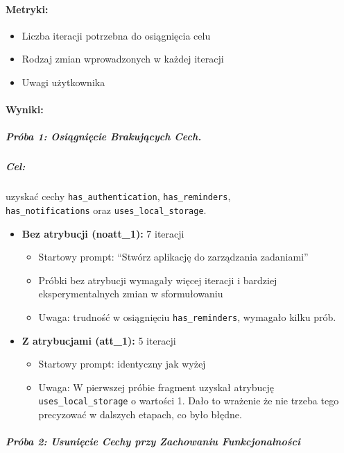 \documentclass[12pt,a4paper]{article}
\begin{document}
\paragraph{Metryki:}
\begin{itemize}
    \item Liczba iteracji potrzebna do osiągnięcia celu
    \item Rodzaj zmian wprowadzonych w każdej iteracji
    \item Uwagi użytkownika
\end{itemize}

\paragraph{Wyniki:}

\subparagraph{Próba 1: Osiągnięcie Brakujących Cech.}

\subparagraph{Cel:} uzyskać cechy \texttt{has\_authentication}, \texttt{has\_reminders},\\ \texttt{has\_notifications} oraz \texttt{uses\_local\_storage}.

\begin{itemize}
    \item \textbf{Bez atrybucji (noatt\_1):} 7 iteracji
    \begin{itemize}
        \item Startowy prompt: ``Stwórz aplikację do zarządzania zadaniami''
        \item Próbki bez atrybucji wymagały więcej iteracji i bardziej eksperymentalnych zmian w sformułowaniu
        \item Uwaga: trudność w osiągnięciu \texttt{has\_reminders}, wymagało kilku prób.
    \end{itemize}
    
    \item \textbf{Z atrybucjami (att\_1):} 5 iteracji
    \begin{itemize}
        \item Startowy prompt: identyczny jak wyżej
        \item Uwaga: W pierwszej próbie fragment uzyskał atrybucję \texttt{uses\_local\_storage} o wartości 1. Dało to wrażenie że nie trzeba tego precyzować w dalszych etapach, co było błędne.
    \end{itemize}
\end{itemize}

\vspace{1cm}

\subparagraph{Próba 2: Usunięcie Cechy przy Zachowaniu Funkcjonalności}
\end{document}
